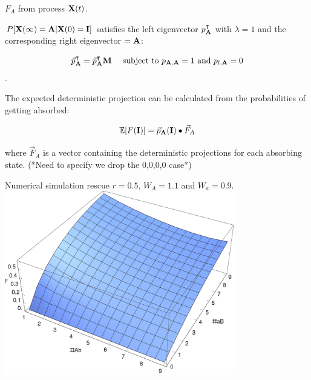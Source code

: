 \documentclass{beamer}
\begin{document}
\begin{frame}{$F_A$ from process $\bold{X}(t)$.}
    
    $P[\bold{X}(\infty) = \bold{A}| \bold{X}(0) = \bold{I}]$ satisfies the left eigenvector $p_\bold{A}^\intercal$ with $\lambda = 1$ and the corresponding right eigenvector $=\bold{A}$:
    
    \begin{equation*}
        \vec{p}_\bold{A}^\intercal = \vec{p}_\bold{A}^\intercal \bold{M} \ \ \ \  \text{subject to } p_{\bold{A},\bold{A}}=1 \ \text{and}\ p_{l,\bold{A}}=0
    \end{equation*}.
    
    The expected deterministic projection can be calculated from the probabilities of getting absorbed: 
    
    \begin{equation*}
        \mathbb{E}[F(\bold{I})] = \vec{p}_\bold{A}(\bold{I}) \bullet \vec{F}_A   %
    \end{equation*}
    
    where $\vec{F}_A$ is a vector containing the deterministic projections for each absorbing state. (*Need to specify we drop the {0,0,0,0} case*)
\end{frame}

\begin{frame}{Numerical simulation rescue}
    $r=0.5$,  $W_A=1.1$ and $W_a=0.9$.
    \includegraphics[width=0.75\textwidth]{Matlab/Figures/Projection3DPlotr050.eps}
\end{frame}
\end{document}
